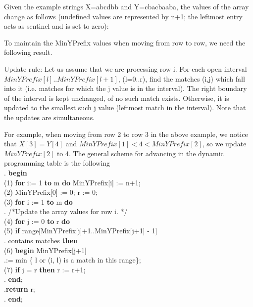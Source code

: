 \documentclass[journal,twoside]{IEEEtran}
\begin{document}
Given the example strings X=abcdbb and Y=cbacbaaba, the values of the array change as follows (undefined values are represented by n+1; the leftmost entry acts as sentinel and is set to zero):

To maintain the MinYPrefix values when moving from row to row, we need the following result.

Update rule: Let us assume that we are processing row i. For each open interval $MinYPrefix[l]..MinYPrefix[l+1]$, (l=0..r), find the matches (i,j) which fall into it (i.e. matches for which the j value is in the interval). The right boundary of the interval is kept unchanged, of no such match exists. Otherwise, it is updated to the smallest such j value (leftmost match in the interval). Note that the updates are simultaneous.

For example, when moving from row 2 to row 3 in the above example, we notice that $X[3] = Y[4]$ and $MinYPrefix[1] < 4 < MinYPrefix[2]$, so we update $MinYPrefix[2]$ to 4. The general scheme for advancing in the dynamic programming table is the following
\\
.\hspace{0.5cm} \textbf{begin}\\
(1) \hspace{0.5cm} \textbf{for} i:= 1 \textbf{to} m \textbf{do} MinYPrefix[i] := n+1; \\
(2) \hspace{0.5cm} MinYPrefix[0] := 0; r := 0; \\
(3) \hspace{0.5cm} \textbf{for} i := 1 \textbf{to} m \textbf{do} \\
. \hspace{1.4cm} /*Update the array values for row i. */\\
(4) \hspace{1.0cm} \textbf{for} j := 0 \textbf{to} r \textbf{do} \\
(5) \hspace{1.4cm} \textbf{if} range[MinYPrefix[j]+1..MinYPrefix[j+1] - 1] \\.\hspace{2.5cm} contains matches \textbf{then}\\
(6) \hspace{1.5cm} \textbf{begin} MinYPrefix[j+1] \\ .\hspace{2.0cm}:= min \{ l or (i, l) is a match in this range\};\\
(7) \hspace{1.6cm} \textbf{if} j = r \textbf{then} r := r+1;\\
  .\hspace{1.6cm}  \textbf{end}; \\
    .\hspace{1.1cm}\textbf{return} r;\\
    .\hspace{0.6cm} \textbf{end}; \\
\end{document}
